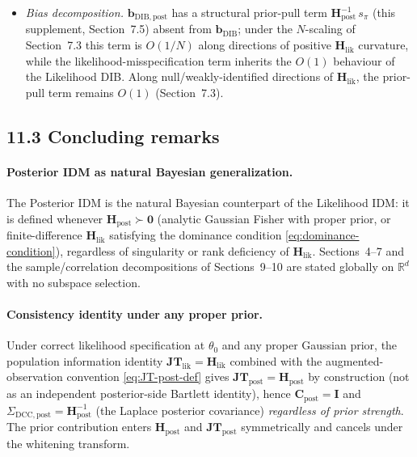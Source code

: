 \documentclass[11pt]{article}
\begin{document}
\begin{itemize}
\item \emph{Bias decomposition.} $\mathbf b_{\mathrm{DIB},\mathrm{post}}$ has a structural prior-pull term $\mathbf H_{\mathrm{post}}^{-1}\, s_\pi$ (this supplement, Section~7.5) absent from $\mathbf b_{\mathrm{DIB}}$; under the $N$-scaling of Section~7.3 this term is $O(1/N)$ along directions of positive $\mathbf H_{\mathrm{lik}}$ curvature, while the likelihood-misspecification term inherits the $O(1)$ behaviour of the Likelihood DIB. Along null/weakly-identified directions of $\mathbf H_{\mathrm{lik}}$, the prior-pull term remains $O(1)$ (Section~7.3).
\end{itemize}

\subsection*{11.3 Concluding remarks}

\paragraph{Posterior IDM as natural Bayesian generalization.}
The Posterior IDM is the natural Bayesian counterpart of the Likelihood IDM: it is defined whenever $\mathbf H_{\mathrm{post}} \succ \mathbf 0$ (analytic Gaussian Fisher with proper prior, or finite-difference $\mathbf H_{\mathrm{lik}}$ satisfying the dominance condition \eqref{eq:dominance-condition}), regardless of singularity or rank deficiency of $\mathbf H_{\mathrm{lik}}$. Sections~4--7 and the sample/correlation decompositions of Sections~9--10 are stated globally on $\mathbb{R}^d$ with no subspace selection.

\paragraph{Consistency identity under any proper prior.}
Under correct likelihood specification at $\theta_0$ and any proper Gaussian prior, the population information identity $\mathbf{JT}_{\mathrm{lik}} = \mathbf H_{\mathrm{lik}}$ combined with the augmented-observation convention \eqref{eq:JT-post-def} gives $\mathbf{JT}_{\mathrm{post}} = \mathbf H_{\mathrm{post}}$ by construction (not as an independent posterior-side Bartlett identity), hence $\mathbf C_{\mathrm{post}} = \mathbf I$ and $\Sigma_{\mathrm{DCC},\mathrm{post}} = \mathbf H_{\mathrm{post}}^{-1}$ (the Laplace posterior covariance) \emph{regardless of prior strength}. The prior contribution enters $\mathbf H_{\mathrm{post}}$ and $\mathbf{JT}_{\mathrm{post}}$ symmetrically and cancels under the whitening transform.
\end{document}
